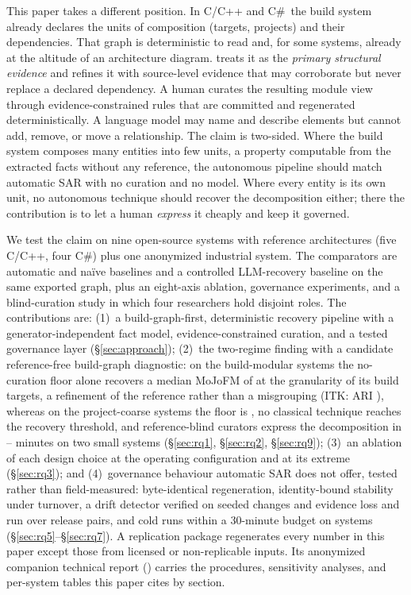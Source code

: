 This paper takes a different position. In C/C++ and C\#\ the build system already declares the
units of composition (targets, projects) and their dependencies. That graph is deterministic to
read and, for some systems, already at the altitude of an architecture diagram. \tool{} treats it
as the \emph{primary structural evidence} and refines it with source-level evidence that may
corroborate but never replace a declared dependency. A human curates the resulting module view
through evidence-constrained rules that are committed and regenerated deterministically. A
language model may name and describe elements but cannot add, remove, or move a relationship.
The claim is two-sided. Where the build system composes many entities into few units, a property
computable from the extracted facts without any reference, the autonomous pipeline should match
automatic SAR with no curation and no model. Where every entity is its own unit, no autonomous
technique should recover the decomposition either; there the contribution is to let a human
\emph{express} it cheaply and keep it governed.

We test the claim on nine open-source systems with reference architectures
(five C/C++, four C\#) plus one anonymized industrial system. The
comparators are \rqTwoBaselineCount{} automatic and na\"ive baselines and a controlled
LLM-recovery baseline on the same exported graph, plus an eight-axis ablation, governance
experiments, and a blind-curation study in which four researchers hold disjoint roles.
The contributions are: (1)~a build-graph-first, deterministic recovery pipeline with a
generator-independent fact model, evidence-constrained curation, and a tested governance layer
(\S\ref{sec:approach}); (2)~the two-regime finding with a candidate reference-free build-graph
diagnostic: on the build-modular systems the no-curation floor alone recovers a median MoJoFM of
\rqOneFloorAdequateMoJo{} at the granularity of its build targets, a refinement of the reference
rather than a misgrouping (ITK: ARI \rqOneFloorItkAri{}), whereas on the project-coarse
systems the floor is
\rqOneFloorCsMoJo{}, no classical technique reaches the recovery threshold, and reference-blind
curators express the decomposition in \rqNineEshopMinutes{}--\rqNineSquidexMinutes{} minutes on
two small systems (\S\ref{sec:rq1}, \S\ref{sec:rq2}, \S\ref{sec:rq9}); (3)~an ablation of each
design choice at the operating configuration and at its extreme (\S\ref{sec:rq3}); and
(4)~governance behaviour automatic SAR does not offer, tested rather than field-measured:
byte-identical regeneration, identity-bound stability under turnover, a drift detector verified
on seeded changes and evidence loss and run over \rqSixHistPairs{} release pairs, and cold runs
within a 30-minute budget on \rqSevenColdBudget{} systems (\S\ref{sec:rq5}--\S\ref{sec:rq7}). A
replication package regenerates every number in this paper except those from licensed or
non-replicable inputs. Its anonymized companion technical report (\TR{}) carries the procedures,
sensitivity analyses, and per-system tables this paper cites by section.
